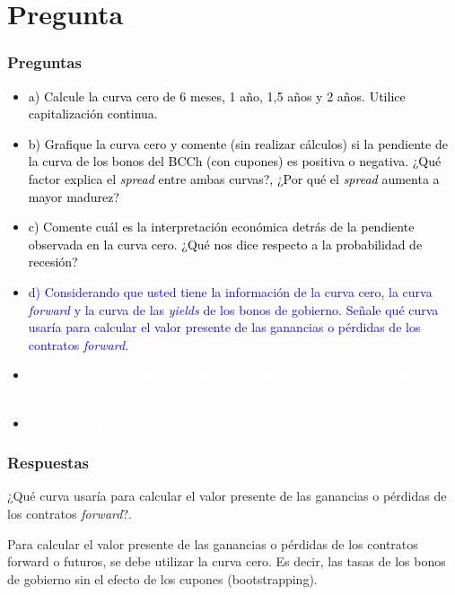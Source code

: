 \documentclass{beamer}
\newif\ifpresentacion
\newcommand{\pausa}{\ifpresentacion\pause\fi}
\begin{document}
\section{Pregunta }

\begin{frame}
  \frametitle{Preguntas}
  \begin{itemize}
    \scriptsize
    \item {\textcolor{black}{a) Calcule la curva cero de 6 meses, 1 año, 1,5 años y 2 años. Utilice capitalización continua.}}
    \vspace{3pt}
    \item {\textcolor{black}{b) Grafique la curva cero y comente (sin realizar cálculos) si la pendiente de la curva de los bonos del BCCh (con cupones) es positiva o negativa. ¿Qué factor explica el \textit{spread} entre ambas curvas?, ¿Por qué el \textit{spread} aumenta a mayor madurez?}}
    \vspace{3pt}
    \item {\textcolor{black}{c) Comente cuál es la interpretación económica detrás de la pendiente observada en la curva cero. ¿Qué nos dice respecto a la probabilidad de recesión?}}
    \vspace{3pt}
    \item {\Large\textcolor{blue}{d) Considerando que usted tiene la información de la curva cero, la curva \textit{forward} y la curva de las \textit{yields} de los bonos de gobierno. Señale qué curva usaría para calcular el valor presente de las ganancias o pérdidas de los contratos \textit{forward}.}}
    \vspace{3pt}
    \item {\textcolor{white}{e) ¿Cuál es el rol de las probabilidades neutrales al riesgo en d)?, ¿Qué rol juega la condición de no arbitraje?}}
    \vspace{3pt}
    \item {\textcolor{white}{f) Realice el punto a) y b)  utilizando matrices en Excel/R/Python.}}
    \vspace{3pt}
  \end{itemize}
\end{frame}

\begin{frame}
  \frametitle{Respuestas }
  \begin{block}{ ¿Qué curva usaría para calcular el valor presente de las ganancias o pérdidas de los contratos \textit{forward}?.}
    \pausa
    Para calcular el valor presente de las ganancias o pérdidas de los contratos forward o
    futuros, se debe utilizar la curva cero. Es decir, las tasas de los bonos de gobierno sin el
    efecto de los cupones (bootstrapping).
  \end{block}
\end{frame}
\end{document}
